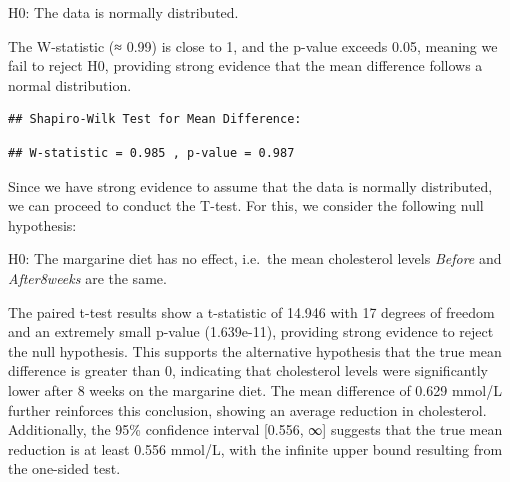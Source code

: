 \documentclass[
  11pt,
]{article}
\newenvironment{Shaded}{\begin{snugshade}}{\end{snugshade}}
\newcommand{\AttributeTok}[1]{\textcolor[rgb]{0.13,0.29,0.53}{#1}}
\newcommand{\ConstantTok}[1]{\textcolor[rgb]{0.56,0.35,0.01}{#1}}
\newcommand{\FunctionTok}[1]{\textcolor[rgb]{0.13,0.29,0.53}{\textbf{#1}}}
\newcommand{\NormalTok}[1]{#1}
\newcommand{\OtherTok}[1]{\textcolor[rgb]{0.56,0.35,0.01}{#1}}
\newcommand{\SpecialCharTok}[1]{\textcolor[rgb]{0.81,0.36,0.00}{\textbf{#1}}}
\newcommand{\StringTok}[1]{\textcolor[rgb]{0.31,0.60,0.02}{#1}}
\begin{document}
H0: The data is normally distributed.

The W-statistic (≈ 0.99) is close to 1, and the p-value exceeds 0.05,
meaning we fail to reject H0, providing strong evidence that the mean
difference follows a normal distribution.

\begin{Shaded}
\end{Shaded}

\begin{verbatim}
## Shapiro-Wilk Test for Mean Difference:
\end{verbatim}

\begin{verbatim}
## W-statistic = 0.985 , p-value = 0.987
\end{verbatim}

Since we have strong evidence to assume that the data is normally
distributed, we can proceed to conduct the T-test. For this, we consider
the following null hypothesis:

H0: The margarine diet has no effect, i.e.~the mean cholesterol levels
\emph{Before} and \emph{After8weeks} are the same.

The paired t-test results show a t-statistic of 14.946 with 17 degrees
of freedom and an extremely small p-value (1.639e-11), providing strong
evidence to reject the null hypothesis. This supports the alternative
hypothesis that the true mean difference is greater than 0, indicating
that cholesterol levels were significantly lower after 8 weeks on the
margarine diet. The mean difference of 0.629 mmol/L further reinforces
this conclusion, showing an average reduction in cholesterol.
Additionally, the 95\% confidence interval {[}0.556, ∞{]} suggests that
the true mean reduction is at least 0.556 mmol/L, with the infinite
upper bound resulting from the one-sided test.

\begin{Shaded}
\end{Shaded}
\end{document}
